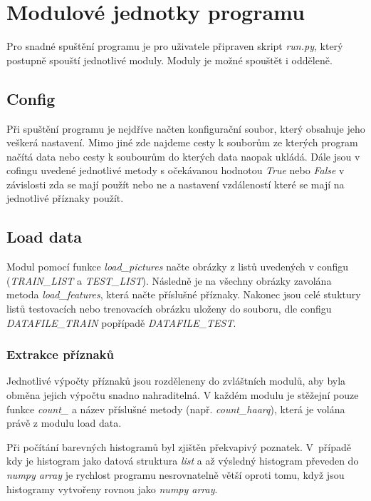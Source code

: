 \documentclass[czech,BP]{thesiskiv}
\begin{document}
\section{Modulové jednotky programu}
Pro snadné spuštění programu je pro uživatele připraven skript \textit{run.py}, který postupně spouští jednotlivé moduly. Moduly je možné spouštět i odděleně.
\subsection{Config}
\par Při spuštění programu je nejdříve načten konfigurační soubor, který obsahuje jeho veškerá nastavení. Mimo jiné zde najdeme cesty k souborům ze kterých program načítá data nebo cesty k soubourům do kterých data naopak ukládá. Dále jsou v cofingu uvedené jednotlivé metody s očekávanou hodnotou \textit{True} nebo \textit{False} v závislosti zda se mají použít nebo ne a nastavení vzdáleností které se mají na jednotlivé příznaky použít.

\subsection{Load data}
\par Modul pomocí funkce \textit{load\_pictures} načte obrázky z listů uvedených v configu (\textit{TRAIN\_LIST} a \textit{TEST\_LIST}). Následně je na všechny obrázky zavolána metoda \textit{load\_features}, která načte příslušné příznaky. Nakonec jsou celé stuktury listů testovacích nebo trenovacích obrázku uloženy do souboru, dle configu \textit{DATAFILE\_TRAIN} popřípadě \textit{DATAFILE\_TEST}.


\subsubsection{Extrakce příznaků}
\par Jednotlivé výpočty příznaků jsou rozděleneny do zvláštních modulů, aby byla obměna jejich výpočtu snadno nahraditelná. V každém modulu je stěžejní pouze funkce \textit{count\_} a název příslušné metody (např. \textit{count\_haarq}), která je volána právě z modulu load data.

\par Při počítání barevných histogramů byl zjištěn překvapivý poznatek. V~případě kdy je histogram jako datová struktura \textit{list} a až výsledný histogram převeden do \textit{numpy array} je rychlost programu nesrovnatelně větší oproti tomu, když jsou histogramy vytvořeny rovnou jako \textit{numpy array}.  
\end{document}
